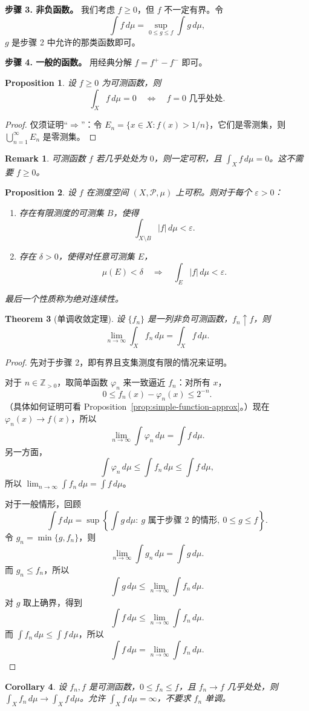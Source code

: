 \documentclass[12pt,letterpaper,twoside,openright]{ctexbook}
\theoremstyle{bluehead}
\newtheorem{theorem}{Theorem}
\newtheorem{proposition}[theorem]{Proposition}
\newtheorem{corollary}[theorem]{Corollary}
\theoremstyle{olivehead}
\theoremstyle{orangehead}
\theoremstyle{redremark}
\newtheorem*{remark}{Remark}
\begin{document}
\textbf{步骤 3. 非负函数。} 我们考虑 $f\geq0$，但 $f$ 不一定有界。令
\[
  \int f\,d\mu=\sup_{0\leq g\leq f}\int g\,d\mu,
\]
$g$ 是步骤 2 中允许的那类函数即可。

\textbf{步骤 4. 一般的函数。} 用经典分解 $f=f^+-f^-$ 即可。

\begin{proposition}
设 $f\geq0$ 为可测函数，则
\[
  \int_X f\,d\mu=0\quad\Longleftrightarrow\quad f=0\text{ 几乎处处}.
\]
\end{proposition}

\begin{proof}
仅须证明“$\Rightarrow$”：令 $E_n=\{x\in X:f(x)>1/n\}$，它们是零测集，则 $\bigcup_{n=1}^{\infty}E_n$ 是零测集。
\end{proof}
\begin{remark}
可测函数 $f$ 若几乎处处为 $0$，则一定可积，且 $\int_X f\,d\mu=0$。这不需要 $f\geq0$。
\end{remark}
\begin{proposition}
设 $f$ 在测度空间 $(X,\mathcal{P},\mu)$ 上可积。则对于每个 $\varepsilon>0$：
\begin{enumerate}
  \item[(1)] 存在有限测度的可测集 $B$，使得
  \[
    \int_{X\setminus B}|f|\,d\mu<\varepsilon.
  \]
  \item[(2)] 存在 $\delta>0$，使得对任意可测集 $E$，
  \[
    \mu(E)<\delta\quad\Longrightarrow\quad\int_E|f|\,d\mu<\varepsilon.
  \]
\end{enumerate}
最后一个性质称为绝对连续性。
\end{proposition}




\begin{theorem}[单调收敛定理]\label{thm:monotone-convergence}
设 $\{f_n\}$ 是一列非负可测函数，$f_n\uparrow f$，则
\[
  \lim_{n\to\infty}\int_X f_n\,d\mu=\int_X f\,d\mu.
\]
\end{theorem}
\begin{proof}
先对于步骤 2，即有界且支集测度有限的情况来证明。

对于 $n\in\mathbb{Z}_{>0}$，取简单函数 $\varphi_n$ 来一致逼近 $f_n$：对所有 $x$，
\[
  0\leq f_n(x)-\varphi_n(x)\leq2^{-n}.
\]
（具体如何证明可看 Proposition~\ref{prop:simple-function-approx}。）现在 $\varphi_n(x)\to f(x)$，所以
\[
  \lim_{n\to\infty}\int\varphi_n\,d\mu=\int f\,d\mu.
\]
另一方面，
\[
  \int\varphi_n\,d\mu\leq\int f_n\,d\mu\leq\int f\,d\mu,
\]
所以 $\lim_{n\to\infty}\int f_n\,d\mu=\int f\,d\mu$。

对于一般情形，回顾
\[
  \int f\,d\mu
  =\sup\left\{\int g\,d\mu:\ g\text{ 属于步骤 2 的情形},\ 0\leq g\leq f\right\}.
\]
令 $g_n=\min\{g,f_n\}$，则
\[
  \lim_{n\to\infty}\int g_n\,d\mu=\int g\,d\mu.
\]
而 $g_n\leq f_n$，所以
\[
  \int g\,d\mu\leq\lim_{n\to\infty}\int f_n\,d\mu.
\]
对 $g$ 取上确界，得到
\[
  \int f\,d\mu\leq\lim_{n\to\infty}\int f_n\,d\mu.
\]
而 $\int f_n\,d\mu\leq\int f\,d\mu$，所以
\[
  \int f\,d\mu=\lim_{n\to\infty}\int f_n\,d\mu.
\]
\end{proof}
\begin{corollary}
设 $f_n,f$ 是可测函数，$0\leq f_n\leq f$，且 $f_n\to f$ 几乎处处，则 $\int_X f_n\,d\mu\to\int_X f\,d\mu$。允许 $\int_X f\,d\mu=\infty$，不要求 $f_n$ 单调。
\end{corollary}
\end{document}
